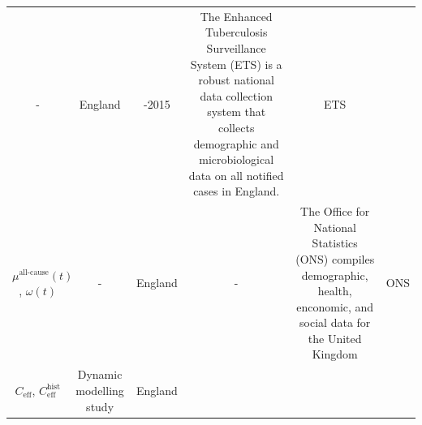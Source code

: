 \documentclass[11pt,twoside]{bristolthesis}
\begin{document}
\begin{longtable}[]{@{}cccccc@{}}
\begin{minipage}[t]{0.10\columnwidth}
  -\strut
  \end{minipage} & \begin{minipage}[t]{0.07\columnwidth}\centering
  England\strut
  \end{minipage} & \begin{minipage}[t]{0.07\columnwidth}\centering
  2000-2015\strut
  \end{minipage} & \begin{minipage}[t]{0.27\columnwidth}\centering
  The Enhanced Tuberculosis Surveillance
  System (ETS) is a robust national data
  collection system that collects
  demographic and microbiological data on
  all notified cases in England.\strut
  \end{minipage} & \begin{minipage}[t]{0.11\columnwidth}\centering
  ETS\strut
  \end{minipage}\tabularnewline
  \begin{minipage}[t]{0.21\columnwidth}\centering
  \(\mu^{\text{all-cause}}(t)\),
  \(\omega(t)\)\strut
  \end{minipage} & \begin{minipage}[t]{0.10\columnwidth}\centering
  -\strut
  \end{minipage} & \begin{minipage}[t]{0.07\columnwidth}\centering
  England\strut
  \end{minipage} & \begin{minipage}[t]{0.07\columnwidth}\centering
  -\strut
  \end{minipage} & \begin{minipage}[t]{0.27\columnwidth}\centering
  The Office for National Statistics (ONS)
  compiles demographic, health, enconomic,
  and social data for the United Kingdom\strut
  \end{minipage} & \begin{minipage}[t]{0.11\columnwidth}\centering
  ONS\strut
  \end{minipage}\tabularnewline
  \begin{minipage}[t]{0.21\columnwidth}\centering
  \(C_{\text{eff}}\),
  \(C^{\text{hist}}_{\text{eff}}\)\strut
  \end{minipage} & \begin{minipage}[t]{0.10\columnwidth}\centering
  Dynamic
  modelling
  study\strut
  \end{minipage} & \begin{minipage}[t]{0.07\columnwidth}\centering
  England\strut
  \end{minipage} & \begin{minipage}[t]{0.07\columnwidth}\centering

\end{minipage}
\end{longtable}
\end{document}
